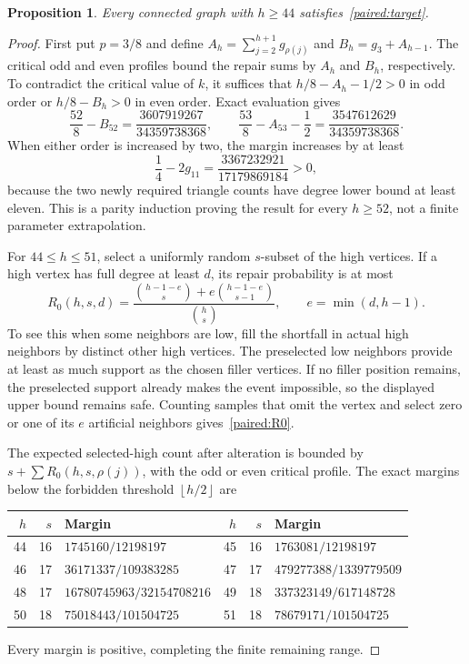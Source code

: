 \documentclass[11pt,a4paper]{article}
\newtheorem{proposition}[theorem]{Proposition}
\theoremstyle{definition}\newtheorem{definition}[theorem]{Definition}
\theoremstyle{remark}\newtheorem{remark}[theorem]{Remark}
\newcommand{\floor}[1]{\left\lfloor#1\right\rfloor}
\begin{document}
\begin{proposition}\label{paired:large44}
Every connected graph with $h\ge44$ satisfies~\eqref{paired:target}.
\end{proposition}
\begin{proof}
First put $p=3/8$ and define
$A_h=\sum_{j=2}^{h+1}g_{\rho(j)}$ and $B_h=g_3+A_{h-1}$.
The critical odd and even profiles bound the repair sums by $A_h$
and $B_h$, respectively. To contradict the critical value of $k$,
it suffices that $h/8-A_h-1/2>0$ in odd order or $h/8-B_h>0$ in
even order. Exact evaluation gives
\[
 \frac{52}{8}-B_{52}=\frac{3607919267}{34359738368},\qquad
 \frac{53}{8}-A_{53}-\frac12=\frac{3547612629}{34359738368}.
\]
When either order is increased by two, the margin increases by at
least
\[
 \frac14-2g_{11}=\frac{3367232921}{17179869184}>0,
\]
because the two newly required triangle counts have degree lower
bound at least eleven. This is a parity induction proving the result
for every $h\ge52$, not a finite parameter extrapolation.

For $44\le h\le51$, select a uniformly random $s$-subset of the high
vertices. If a high vertex has full degree at least $d$, its repair
probability is at most
\begin{equation}\label{paired:R0}
 R_0(h,s,d)=\frac{\binom{h-1-e}{s}+e\binom{h-1-e}{s-1}}
                       {\binom hs},\qquad e=\min(d,h-1).
\end{equation}
To see this when some neighbors are low, fill the shortfall in actual
high neighbors by distinct other high vertices. The preselected low
neighbors provide at least as much support as the chosen filler
vertices. If no filler position remains, the preselected support
already makes the event impossible, so the displayed upper bound
remains safe. Counting samples that omit the vertex and select zero
or one of its $e$ artificial neighbors gives~\eqref{paired:R0}.

The expected selected-high count after alteration is bounded by
$s+\sum R_0(h,s,\rho(j))$, with the odd or even critical profile.
The exact margins below the forbidden threshold $\floor{h/2}$ are
\begin{center}\small
\begin{tabular}{rrl@{\qquad}rrl}
\toprule
$h$&$s$&Margin&$h$&$s$&Margin\\\midrule
44&16&$1745160/12198197$&45&16&$1763081/12198197$\\
46&17&$36171337/109383285$&47&17&$479277388/1339779509$\\
48&17&$16780745963/32154708216$&49&18&$337323149/617148728$\\
50&18&$75018443/101504725$&51&18&$78679171/101504725$\\\bottomrule
\end{tabular}
\end{center}
Every margin is positive, completing the finite remaining range.
\end{proof}
\end{document}

